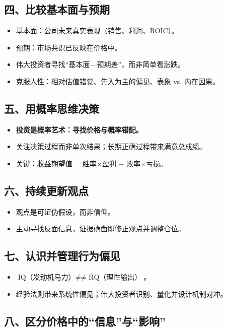 \subsection{四、比较基本面与预期}

\begin{itemize}
  \item 基本面：公司未来真实表现（销售、利润、ROIC）。
  \item 预期：市场共识已反映在价格中。
  \item 伟大投资者寻找“基本面—预期差”，而非简单看涨跌。
  \item 克服人性：相对估值错觉、先入为主的偏见、表象 vs. 内在因果。
\end{itemize}

\subsection{五、用概率思维决策}

\begin{itemize}
  \item \textbf{投资是概率艺术：寻找价格与概率错配。}
  \item 关注决策过程而非单次结果；长期正确过程带来满意总成绩。
  \item 关键：收益期望值 = 胜率×盈利 − 败率×亏损。
\end{itemize}

\subsection{六、持续更新观点}

\begin{itemize}
  \item 观点是可证伪假设，而非信仰。
  \item 主动寻找反面信息，证据确凿即修正观点并调整仓位。
\end{itemize}

\subsection{七、认识并管理行为偏见}

\begin{itemize}
  \item  $\text{IQ（发动机马力）}  \neq \text{≠ RQ（理性输出）}$。
  \item 经验法则带来系统性偏见；伟大投资者识别、量化并设计机制对冲。
\end{itemize}

\subsection{八、区分价格中的“信息”与“影响”}

